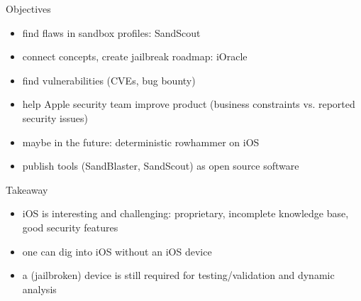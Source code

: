 \documentclass{beamer}
\begin{document}
\begin{frame}{Objectives}
  \begin{itemize}
    \item find flaws in sandbox profiles: SandScout
    \item connect concepts, create jailbreak roadmap: iOracle
    \item find vulnerabilities (CVEs, bug bounty)
    \item help Apple security team improve product (business constraints vs. reported security issues)
    \item maybe in the future: deterministic rowhammer on iOS
    \item publish tools (SandBlaster, SandScout) as open source software
  \end{itemize}
\end{frame}

\begin{frame}{Takeaway}
  \begin{itemize}
    \item iOS is interesting and challenging: proprietary, incomplete knowledge base, good security features
    \item one can dig into iOS without an iOS device
    \item a (jailbroken) device is still required for testing/validation and dynamic analysis
  \end{itemize}
\end{frame}
\end{document}
